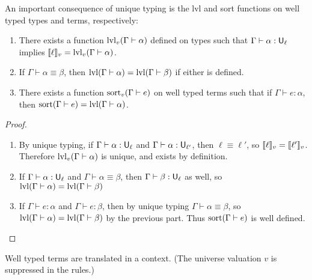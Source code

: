 An important consequence of unique typing is the lvl and sort functions on well typed types and terms, respectively:
\begin{lemma}
\begin{enumerate}
\item There exists a function $\lvl_v(\Gamma\vdash\alpha)$ defined on types such that $\Gamma\vdash\alpha:\U_\ell$ implies $\scott{\ell}_v=\lvl_v(\Gamma\vdash \alpha)$.
\item If $\Gamma\vdash\alpha\equiv\beta$, then $\lvl(\Gamma\vdash\alpha)=\lvl(\Gamma\vdash\beta)$ if either is defined.
\item There exists a function $\sort_v(\Gamma\vdash e)$ on well typed terms such that if $\Gamma\vdash e:\alpha$, then $\sort(\Gamma\vdash e)=\lvl(\Gamma\vdash\alpha)$.
\end{enumerate}
\end{lemma}
\begin{proof}
\begin{enumerate}
\item By unique typing, if $\Gamma\vdash\alpha:\U_\ell$ and $\Gamma\vdash\alpha:\U_{\ell'}$, then $\ell\equiv\ell'$, so $\llbracket \ell\rrbracket_v=\llbracket \ell'\rrbracket_v$. Therefore $\lvl_v(\Gamma\vdash\alpha)$ is unique, and exists by definition.

\item If $\Gamma\vdash\alpha:\U_\ell$ and $\Gamma\vdash\alpha\equiv\beta$, then $\Gamma\vdash\beta:\U_\ell$ as well, so $\lvl(\Gamma\vdash\alpha)=\lvl(\Gamma\vdash\beta)$

\item If $\Gamma\vdash e:\alpha$ and $\Gamma\vdash e:\beta$, then by unique typing $\Gamma\vdash \alpha\equiv\beta$, so $\lvl(\Gamma\vdash\alpha)=\lvl(\Gamma\vdash\beta)$ by the previous part. Thus $\sort(\Gamma\vdash e)$ is well defined.
\end{enumerate}\vspace{-1.5em}
\end{proof}
Well typed terms are translated in a context. (The universe valuation $v$ is suppressed in the rules.)
